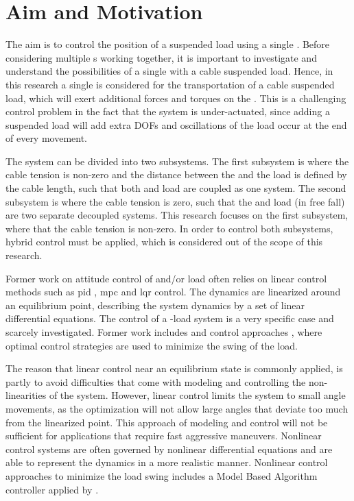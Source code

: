 \newpage
\section{Aim and Motivation}\label{sec:int.motivation}
The aim is to control the position of a suspended load using a single . Before considering multiple s working together, it is important to investigate and understand the possibilities of a single  with a cable suspended load. Hence, in this research a single  is considered for the transportation of a cable suspended load, which will exert additional forces and torques on the . This is a challenging control problem in the fact that the  system is under-actuated, since adding a suspended load will add extra \acf{DOF}s and oscillations of the load occur at the end of every movement. 

The system can be divided into two subsystems. The first subsystem is where the cable tension is non-zero and the distance between the  and the load is defined by the cable length, such that both  and load are coupled as one system. The second subsystem is where the cable tension is zero, such that the  and load (in free fall) are two separate decoupled systems. This research focuses on the first subsystem, where that the cable tension is non-zero. In order to control both subsystems, hybrid control must be applied, which is considered out of the scope of this research.

Former work on attitude control of  and/or load often relies on linear control methods such as \acs{pid} \cite{Bouabdallah2004c,Michael2010b}, \acs{mpc} \cite{Bangura2014} and \acs{lqr} \cite{Reyes-Valeria2013} control. The dynamics are linearized around an equilibrium point, describing the system dynamics by a set of linear differential equations. 
The control of a -load system is a very specific case and scarcely investigated. Former work includes  \cite{PraveenThesis,Luis2016} and  control approaches \cite{Becker2013}, where optimal control strategies are used to minimize the swing of the load. 

The reason that linear control near an equilibrium state is commonly applied, is partly to avoid difficulties that come with modeling and controlling the non-linearities of the system. However, linear control limits the system to small angle movements, 
as the optimization will not allow large angles that deviate too much from the linearized point.  
This approach of modeling and control will not be sufficient for applications that require fast aggressive maneuvers.
Nonlinear control systems are often governed by nonlinear differential equations and are able to represent the dynamics in a more realistic manner. Nonlinear control approaches to minimize the load swing includes a Model Based Algorithm controller applied by \cite{Sadr2014}. 

